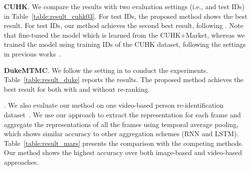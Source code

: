 \documentclass{llncs}
\begin{document}
\vspace{.1cm}
\noindent\textbf{CUHK}.
We compare the results with two evaluation settings (i.e.,  and  test IDs) in Table~\ref{table:result_cuhk03}. For  test IDs, the proposed method shows the best result. For  test IDs, our method achieves the second best result, following \cite{journal/arxiv/geng16}. Note that \cite{journal/arxiv/geng16} fine-tuned the model which is learned from the CUHK+Market, whereas we trained the model using  training IDs of the CUHK dataset, following the settings in previous works~\cite{improved2015,chen2016deep,ChengGZWZ16,ZhaoLZW17}.

\vspace{.1cm}
\noindent\textbf{DukeMTMC}.
We follow the setting in \cite{journal/arxiv/lin17}
to conduct the experiments.
Table~\ref{table:result_duke} reports the results.
The proposed method achieves the best result for both with and without re-ranking.

\vspace{.1cm}
.
We also evaluate our method on one video-based person re-identification dataset~\cite{ZhengBSWSWT16}.
We use our approach to extract the representation
for each frame
and aggregate the representations of all the frames
using temporal average pooling,
which shows similar accuracy to other aggregation schemes (RNN and LSTM).
Table~\ref{table:result_mars} presents the comparison with the competing methods. Our method shows the highest accuracy over both image-based and video-based approaches.
\end{document}

